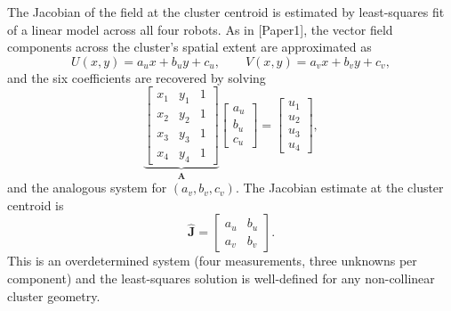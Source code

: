 \documentclass[lettersize,journal]{IEEEtran}
\begin{document}
The Jacobian of the field at the cluster centroid is estimated by least-squares fit of a linear model across all four robots. As in [Paper1], the vector field components across the cluster's spatial extent are approximated as
\begin{equation}
U(x,y) = a_u x + b_u y + c_u, \qquad V(x,y) = a_v x + b_v y + c_v,
\end{equation}
and the six coefficients are recovered by solving
\begin{equation}
\underbrace{\begin{bmatrix} x_1 & y_1 & 1 \\ x_2 & y_2 & 1 \\ x_3 & y_3 & 1 \\ x_4 & y_4 & 1 \end{bmatrix}}_{\mathbf{A}}
\begin{bmatrix} a_u \\ b_u \\ c_u \end{bmatrix}
= \begin{bmatrix} u_1 \\ u_2 \\ u_3 \\ u_4 \end{bmatrix},
\end{equation}
and the analogous system for $(a_v, b_v, c_v)$. The Jacobian estimate at the cluster centroid is
\begin{equation}
\hat{\mathbf{J}} = \begin{bmatrix} a_u & b_u \\ a_v & b_v \end{bmatrix}.
\end{equation}
This is an overdetermined system (four measurements, three unknowns per component) and the least-squares solution is well-defined for any non-collinear cluster geometry.
\end{document}
